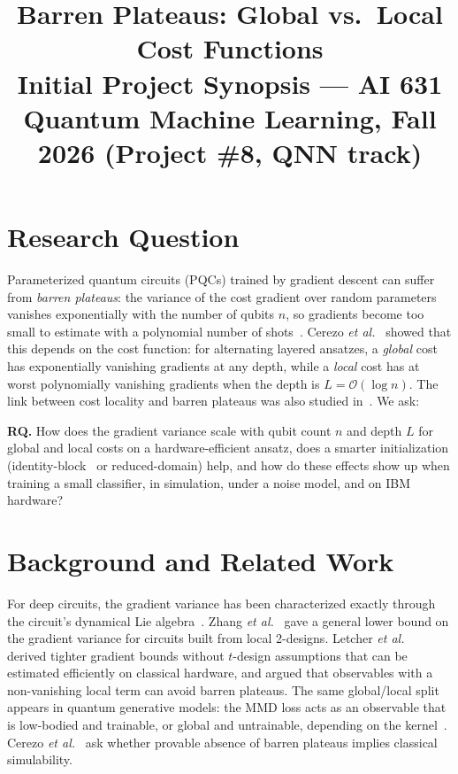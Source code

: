 \documentclass[conference]{IEEEtran}
\begin{document}
\title{Barren Plateaus: Global vs.\ Local Cost Functions\\
\large Initial Project Synopsis --- AI 631 Quantum Machine Learning, Fall 2026 (Project \#8, QNN track)}

\author{
}

\maketitle

\section{Research Question}
Parameterized quantum circuits (PQCs) trained by gradient descent can suffer
from \emph{barren plateaus}: the variance of the cost gradient over random
parameters vanishes exponentially with the number of qubits $n$, so gradients
become too small to estimate with a polynomial number of shots~\cite{mcclean2018,larocca2025}.
Cerezo \emph{et al.}~\cite{cerezo2021} showed that this depends on the cost
function: for alternating layered ansatzes, a \emph{global} cost has
exponentially vanishing gradients at any depth, while a \emph{local} cost has
at worst polynomially vanishing gradients when the depth is
$L=\mathcal{O}(\log n)$. The link between cost locality and barren plateaus
was also studied in~\cite{uvarov2021}. We ask:

\textbf{RQ.} How does the gradient variance scale with qubit count $n$ and depth
$L$ for global and local costs on a hardware-efficient ansatz, does a smarter
initialization (identity-block~\cite{grant2019} or reduced-domain) help, and how
do these effects show up when training a small classifier, in simulation, under
a noise model, and on IBM hardware?

\section{Background and Related Work}
For deep circuits, the gradient variance has been characterized exactly
through the circuit's dynamical Lie algebra~\cite{ragone2024,fontana2024}.
Zhang \emph{et al.}~\cite{zhang2024} gave a general lower bound on the gradient
variance for circuits built from local 2-designs. Letcher
\emph{et al.}~\cite{letcher2024} derived tighter gradient bounds without
$t$-design assumptions that can be estimated efficiently on classical hardware,
and argued that observables with a non-vanishing local term can avoid barren
plateaus. The same global/local split appears in quantum generative models:
the MMD loss acts as an observable that is low-bodied and trainable, or global
and untrainable, depending on the kernel~\cite{rudolph2024}.
Cerezo \emph{et al.}~\cite{cerezo2025} ask whether provable absence of barren
plateaus implies classical simulability.
\end{document}
